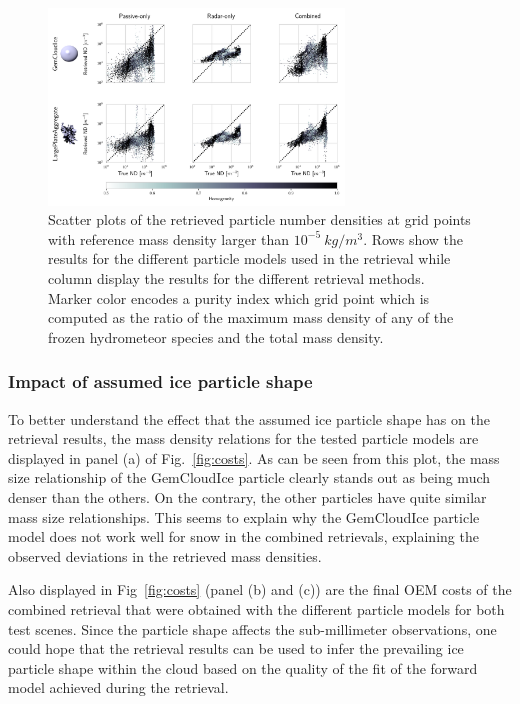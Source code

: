 \documentclass[journal abbreviation, manuscript]{copernicus}
\begin{document}
\begin{figure}
\centering
\includegraphics[width = 0.7\textwidth]{../plots/results_nd_scatter_a}
\caption{Scatter plots of the retrieved particle number densities at grid points with
  reference mass density larger than $10^{-5}\ \unit{kg/m^3}$. Rows show the results
  for the different particle models used in the retrieval while column display the
  results for the different retrieval methods. Marker color encodes a purity index 
  which grid point which is computed as the ratio of the maximum mass density of
  any of the frozen hydrometeor species and the total mass density.}
\label{fig:results_nd_scatter_a}
\end{figure}

\subsubsection{Impact of assumed ice particle shape}

To better understand the effect that the assumed ice particle shape has on the
retrieval results, the mass density relations for the tested particle models are
displayed in panel (a) of Fig.~\ref{fig:costs}. As can be seen from this plot,
the mass size relationship of the GemCloudIce particle clearly stands out as
being much denser than the others. On the contrary, the other particles have
quite similar mass size relationships. This seems to explain why the GemCloudIce
particle model does not work well for snow in the combined retrievals,
explaining the observed deviations in the retrieved mass densities.

Also displayed in Fig~\ref{fig:costs} (panel (b) and (c)) are the final OEM
costs of the combined retrieval that were obtained with the different particle
models for both test scenes. Since the particle shape affects the sub-millimeter
observations, one could hope that the retrieval results can be used to infer the
prevailing ice particle shape within the cloud based on the quality of the fit
of the forward model achieved during the retrieval.
\end{document}
